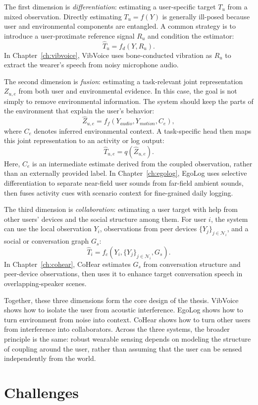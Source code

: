 The first dimension is \textit{differentiation}: estimating a user-specific target $T_u$ from a mixed observation. Directly estimating $T_u = f(Y)$ is generally ill-posed because user and environmental components are entangled. A common strategy is to introduce a user-proximate reference signal $R_u$ and condition the estimator:
\[
\hat{T}_u = f_d(Y, R_u).
\]
In Chapter~\ref{ch:vibvoice}, VibVoice uses bone-conducted vibration as $R_u$ to extract the wearer's speech from noisy microphone audio.

The second dimension is \textit{fusion}: estimating a task-relevant joint representation $Z_{u,e}$ from both user and environmental evidence. In this case, the goal is not simply to remove environmental information. The system should keep the parts of the environment that explain the user's behavior:
\[
\hat{Z}_{u,e} = f_f(Y_{audio}, Y_{motion}, C_e),
\]
where $C_e$ denotes inferred environmental context. A task-specific head then maps this joint representation to an activity or log output:
\[
\hat{T}_{u,e} = q(\hat{Z}_{u,e}).
\]
Here, $C_e$ is an intermediate estimate derived from the coupled observation, rather than an externally provided label. In Chapter~\ref{ch:egolog}, EgoLog uses selective differentiation to separate near-field user sounds from far-field ambient sounds, then fuses activity cues with scenario context for fine-grained daily logging.

The third dimension is \textit{collaboration}: estimating a user target with help from other users' devices and the social structure among them. For user $i$, the system can use the local observation $Y_i$, observations from peer devices $\{Y_j\}_{j \in \mathcal{N}_i}$, and a social or conversation graph $G_s$:
\[
\hat{T}_i = f_c(Y_i, \{Y_j\}_{j \in \mathcal{N}_i}, G_s).
\]
In Chapter~\ref{ch:cohear}, CoHear estimates $G_s$ from conversation structure and peer-device observations, then uses it to enhance target conversation speech in overlapping-speaker scenes.

Together, these three dimensions form the core design of the thesis. VibVoice shows how to isolate the user from acoustic interference. EgoLog shows how to turn environment from noise into context. CoHear shows how to turn other users from interference into collaborators. Across the three systems, the broader principle is the same: robust wearable sensing depends on modeling the structure of coupling around the user, rather than assuming that the user can be sensed independently from the world.

\section{Challenges}

